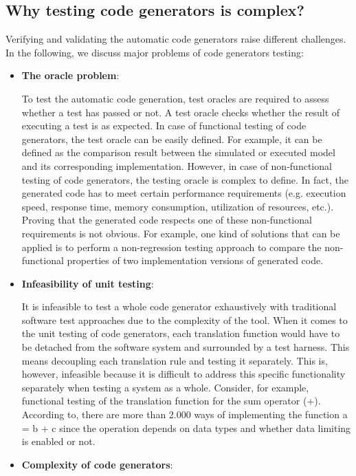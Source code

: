 \subsection{Why testing code generators is complex?}
\label{sec:Why testing code generators is complex?}
Verifying and validating the automatic code generators raise different challenges.
In the following, we discuss major problems of code generators testing:
\begin{itemize}
	\item \textbf{The oracle problem}: 
	
	To test the automatic code generation, test oracles are required to assess whether a test has passed or not. A test
	oracle checks whether the result of executing a test is as expected.
	In case of functional testing of code generators, the test oracle can be easily defined. For example, it can be defined as the comparison result between the simulated or executed model and its corresponding implementation. 
	However, in case of non-functional testing of code generators, the testing oracle is complex to define. In fact, the generated code has to meet certain performance requirements (e.g. execution speed, response time, memory consumption, utilization of resources, etc.). Proving that the generated code respects one of these non-functional requirements is not obvious. For example, one kind of solutions that can be applied is to perform a non-regression testing approach to compare the non-functional properties of two implementation versions of generated code.
	
	\item \textbf{Infeasibility of unit testing}:
	 
	It is infeasible to test a whole code generator exhaustively with traditional software test approaches due to the complexity of the tool. When it comes to the unit testing of code generators, each translation function would have to be detached from the software system and surrounded by a test harness. This means decoupling each translation rule and testing it separately. This is, however, infeasible because it is difficult to address this specific functionality separately when testing a system as a whole. 
	Consider, for example, functional testing of the translation function for the sum operator (+). According to\cite{burnard2004verifying}, there are more than 2.000 ways of implementing the function a = b + c since the operation depends on data types and whether data limiting is enabled or not.
		
	\item \textbf{Complexity of code generators}: 
	

\end{itemize}
